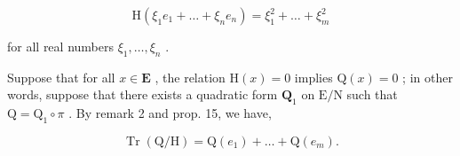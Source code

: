 \[
\mathrm{H} \left(\xi_ {1} e _ {1} + \dots + \xi_ {n} e _ {n}\right) = \xi_ {1} ^ {2} + \dots + \xi_ {m} ^ {2}\tag{46}
\]

for all real numbers \(\xi_1, \ldots, \xi_n\) .

Suppose that for all \(x \in \mathbf{E}\) , the relation \(\mathrm{H}(x) = 0\) implies \(\mathrm{Q}(x) = 0\) ; in other words, suppose that there exists a quadratic form \(\mathbf{Q}_1\) on \(\mathrm{E} / \mathrm{N}\) such that \(\mathrm{Q} = \mathrm{Q}_1 \circ \pi\) . By remark 2 and prop. 15, we have,

\[
\operatorname{Tr} (\mathrm{Q} / \mathrm{H}) = \mathrm{Q} (e _ {1}) + \dots + \mathrm{Q} (e _ {m}).\tag{47}
\]

\exercisesheading
